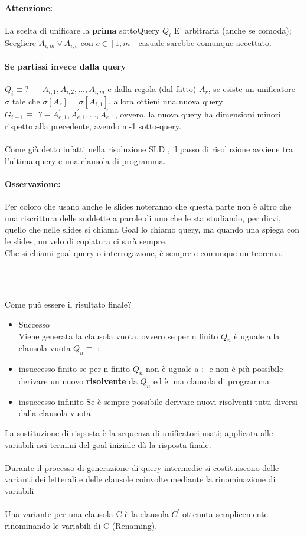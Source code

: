 \documentclass[12pt, a4paper, openany, oneside]{book}
\begin{document}
\paragraph{Attenzione: } La scelta di unificare la \textbf{prima} sottoQuery 
$Q_{i}$ E' arbitraria (anche se comoda); Scegliere $A_{i,m} \vee A_{i,c}$ con 
$c \in [1,m]$ casuale sarebbe comunque accettato.
\paragraph{Se partissi invece dalla query}
$Q_{i} \equiv ?- ~~ A_{i,1}, A_{i,2}, ..., A_{i,m}$ e dalla regola (dal fatto) 
$A_{r}$, se esiste un unificatore $\sigma$ tale che $\sigma [A_{r}] = \sigma [A_{i,1}]$,
allora ottieni una nuova query $G_{i+1} \equiv ~~ ?- A_{e,1}^{'}, A_{e,1}^{'}, 
..., A_{e,1}^{'} $, ovvero, la nuova query ha dimensioni minori rispetto alla 
precedente, avendo m-1 sotto-query. \\ \\
Come già detto infatti nella risoluzione SLD , il passo di risoluzione avviene 
tra l'ultima query e una clausola di programma. 
\paragraph{Osservazione: } Per coloro che usano anche le slides noteranno che 
questa parte non è altro che una riscrittura delle suddette a parole di uno che
le sta studiando, per dirvi, quello che nelle slides si chiama Goal lo chiamo query,
ma quando una spiega con le slides, un velo di copiatura ci sarà sempre.\\
Che si chiami goal query o interrogazione, è sempre e comunque un teorema.
\\ \\
{\color{black} \rule{\linewidth}{0.3mm} }
\\
Come può essere il risultato finale? \\
\begin{itemize}
	\item Successo\\
	Viene generata la clausola vuota, ovvero se per n finito $Q_{n}$ è uguale 
	alla clausola vuota $Q_{n} \equiv $ :- 
	\item insuccesso finito
	se per n finito $Q_{n}$ non è uguale a :- e non è più possibile derivare un 
	nuovo \textbf{risolvente} da $Q_{n}$ ed è una clausola di programma
	\item insuccesso infinito
	Se è sempre possibile derivare nuovi risolventi tutti diversi dalla clausola
	vuota
\end{itemize}
La sostituzione di risposta è la sequenza di unificatori usati; applicata alle
variabili nei termini del goal iniziale dà la risposta finale.
\\ \\
Durante il processo di generazione di query intermedie si costituiscono delle 
varianti dei letterali e delle clausole coinvolte mediante la rinominazione di
variabili
\\ \\
Una variante per una clausola C è la clausola $C^{'}$ ottenuta semplicemente 
rinominando le variabili di C (Renaming).
\end{document}
